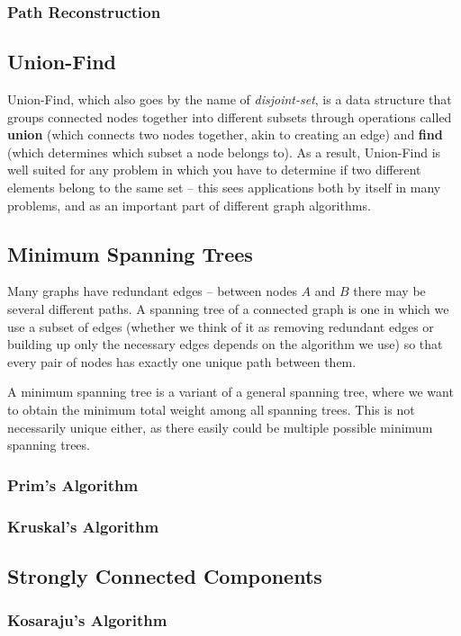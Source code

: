 \subsubsection{Path Reconstruction}
\subsection{Union-Find}

Union-Find, which also goes by the name of \textit{disjoint-set}, is a data structure that groups connected nodes together into different subsets through operations called \textbf{union} (which connects two nodes together, akin to creating an edge) and \textbf{find} (which determines which subset a node belongs to). As a result, Union-Find is well suited for any problem in which you have to determine if two different elements belong to the same set -- this sees applications both by itself in many problems, and as an important part of different graph algorithms.

\subsection{Minimum Spanning Trees}

Many graphs have redundant edges -- between nodes $A$ and $B$ there may be several different paths. A spanning tree of a connected graph is one in which we use a subset of edges (whether we think of it as removing redundant edges or building up only the necessary edges depends on the algorithm we use) so that every pair of nodes has exactly one unique path between them.

A minimum spanning tree is a variant of a general spanning tree, where we want to obtain the minimum total weight among all spanning trees. This is not necessarily unique either, as there easily could be multiple possible minimum spanning trees.

\subsubsection{Prim's Algorithm}
\subsubsection{Kruskal's Algorithm}
\subsection{Strongly Connected Components}
\subsubsection{Kosaraju's Algorithm}
